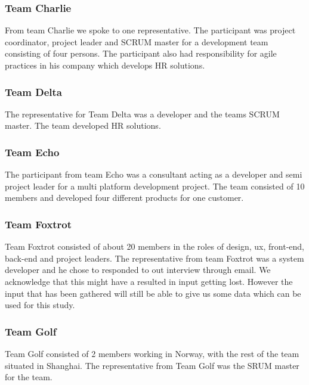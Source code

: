 \subsubsection{Team Charlie}
From team Charlie we spoke to one representative. The participant was project coordinator, project leader and SCRUM master for a development team consisting of four persons. The participant also had responsibility for agile practices in his company which develops HR solutions. 

\subsubsection{Team Delta}
The representative for Team Delta was a developer and the teams SCRUM master. The team developed HR solutions. 

\subsubsection{Team Echo}
The participant from team Echo was a consultant acting as a developer and semi project leader for a multi platform development project. The team consisted of 10 members and developed four different products for one customer.

\subsubsection{Team Foxtrot}
Team Foxtrot consisted of about 20 members in the roles of design, ux, front-end, back-end and project leaders. The representative from team Foxtrot was a system developer and he chose to responded to out interview through email. We acknowledge that this might have a resulted in input getting lost. However the input that has been gathered will still be able to give us some data which can be used for this study. 

\subsubsection{Team Golf}
Team Golf consisted of 2 members working in Norway, with the rest of the team situated in Shanghai. The representative from Team Golf was the SRUM master for the team. 

